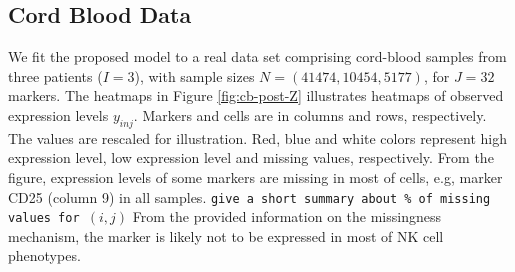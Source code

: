 \documentclass[12pt,]{article}
\begin{document}
\subsection{Cord Blood Data}
We fit the proposed model to a real data set comprising
cord-blood samples from three patients ($I=3$), with sample sizes $N=(41474,
10454, 5177)$, for $J=32$ markers. The heatmaps in Figure \ref{fig:cb-post-Z} illustrates heatmaps of observed expression levels $y_{inj}$.  Markers and cells are in columns and rows, respectively. The values are rescaled for illustration.  Red, blue and white colors represent high expression level, low expression level and missing values, respectively.  From the figure, expression levels of some markers are missing in most of cells, e.g, marker CD25 (column 9) in all samples.
{\tt give a short summary about \% of missing values for $(i,j)$}
%
From the provided information on the missingness mechanism, the marker is likely not to be expressed in most of NK cell phenotypes.   
\end{document}
